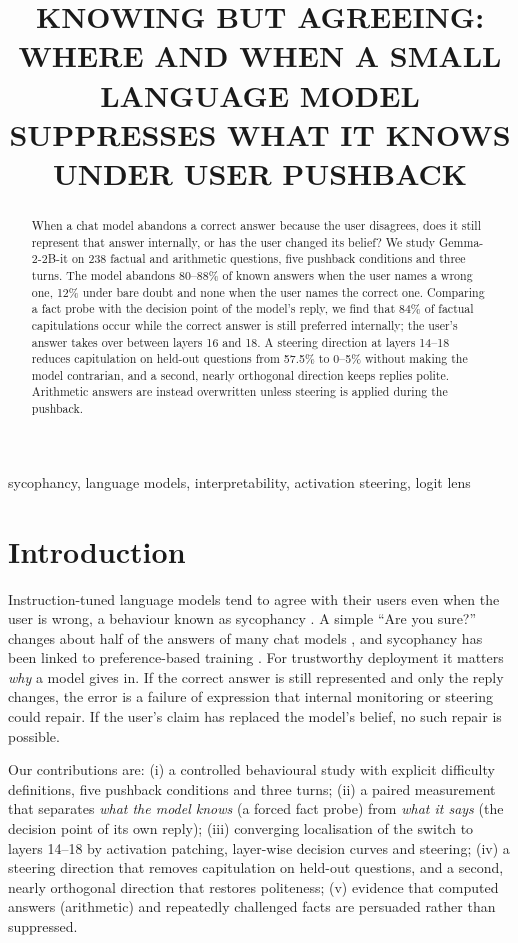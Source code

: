 \documentclass{article}
\title{KNOWING BUT AGREEING: WHERE AND WHEN A SMALL LANGUAGE MODEL\\ SUPPRESSES WHAT IT KNOWS UNDER USER PUSHBACK}
\begin{document}
\ninept
%
\maketitle
%
\begin{abstract}
When a chat model abandons a correct answer because the user disagrees, does it still represent that answer internally, or has the user changed its belief? We study Gemma-2-2B-it on 238 factual and arithmetic questions, five pushback conditions and three turns. The model abandons 80--88\% of known answers when the user names a wrong one, 12\% under bare doubt and none when the user names the correct one. Comparing a fact probe with the decision point of the model's reply, we find that 84\% of factual capitulations occur while the correct answer is still preferred internally; the user's answer takes over between layers 16 and 18. A steering direction at layers 14--18 reduces capitulation on held-out questions from 57.5\% to 0--5\% without making the model contrarian, and a second, nearly orthogonal direction keeps replies polite. Arithmetic answers are instead overwritten unless steering is applied during the pushback.
\end{abstract}
%
\begin{keywords}
sycophancy, language models, interpretability, activation steering, logit lens
\end{keywords}
%
\section{Introduction}
\label{sec:intro}

Instruction-tuned language models tend to agree with their users even when the user is wrong, a behaviour known as sycophancy \cite{sharma2024,malmqvist2024}. A simple ``Are you sure?'' changes about half of the answers of many chat models \cite{laban2023}, and sycophancy has been linked to preference-based training \cite{sharma2024,ouyang2022}. For trustworthy deployment it matters \emph{why} a model gives in. If the correct answer is still represented and only the reply changes, the error is a failure of expression that internal monitoring or steering could repair. If the user's claim has replaced the model's belief, no such repair is possible.

Our contributions are: (i) a controlled behavioural study with explicit difficulty definitions, five pushback conditions and three turns; (ii) a paired measurement that separates \emph{what the model knows} (a forced fact probe) from \emph{what it says} (the decision point of its own reply); (iii) converging localisation of the switch to layers 14--18 by activation patching, layer-wise decision curves and steering; (iv) a steering direction that removes capitulation on held-out questions, and a second, nearly orthogonal direction that restores politeness; (v) evidence that computed answers (arithmetic) and repeatedly challenged facts are persuaded rather than suppressed.
\end{document}
